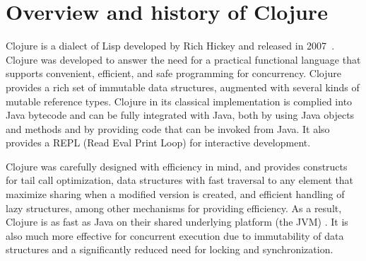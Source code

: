 \documentclass[submission,copyright,creativecommons]{eptcs}
\newcommand{\allcomments}[1]{{#1}}
\newcommand{\elenacomment}[1]{{\bf \textcolor{ForestGreen}{\allcomments{{#1}}}}}
\newcommand{\stephencomment}[1]{{\bf \color{StephensBlue}{\allcomments{{#1}}}}} %
\newcommand{\joecomment}[1]{{\bf \color{JoesGold}{\allcomments{{#1}}}}}
\newcommand{\todo}[1]{{\bf \color{magenta}{\allcomments{ To-do: {#1}}}}}
\begin{document}


\section{Overview and history of Clojure}
Clojure is a dialect of Lisp developed by Rich Hickey and released in 2007~\cite{Hickey:2008}. Clojure was developed to answer the need for a practical  functional language that supports convenient, efficient, and safe programming for concurrency. Clojure provides a rich set of immutable data structures, augmented with several kinds of mutable reference types. Clojure in its classical implementation is complied into Java bytecode and can be fully integrated with Java, both by using Java objects and methods and by providing code that can be invoked from Java. It also provides a REPL (Read Eval Print Loop) %
for interactive development.

Clojure was carefully designed with efficiency in mind, and provides constructs for tail call optimization,
data structures with fast traversal to any element that maximize sharing when a modified version is created, and efficient handling of lazy structures, among other mechanisms for providing efficiency. As a result, Clojure is as fast as Java on their shared underlying platform (the JVM) %
. It is also much more effective %
for concurrent execution due to immutability of data structures and a significantly reduced need for locking and synchronization. 
\end{document}
